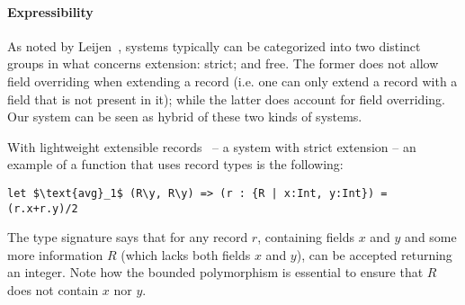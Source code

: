 \begin{comment}
\begin{lstlisting}[mathescape=true]
let $\text{addL}_3$ (A * { l : $\bot$ }) (x : A) : A & { l : $\bot$ } = $\ldots$ in $\ldots$ 
\end{lstlisting}
Unfortunately, our system does not support the $\bot$ type, so this program would not be accepted.
We will get into the reasons for this in further detail, in Section~\ref{sec:conclusion}.
\end{comment}


\paragraph{Expressibility}
As noted by Leijen~\cite{leijen2005extensible}, systems typically can be
categorized into two distinct groups in what concerns extension:
strict; and free. The former does not allow field overriding when
extending a record (i.e. one can only extend a record with a field
that is not present in it); while the latter does account for field
overriding.  Our system can be seen as hybrid of these two kinds of
systems.  

With lightweight extensible records~\cite{jones99lightweight} -- a system with strict extension -- an example of a function that uses 
record types is the following:
\begin{lstlisting}[mathescape=true]
let $\text{avg}_1$ (R\y, R\y) => (r : {R | x:Int, y:Int}) = (r.x+r.y)/2
\end{lstlisting}
The type signature says that for any record $r$, containing fields $x$
and $y$ and some more information $R$ (which lacks both fields $x$ and
$y$), can be accepted returning an integer.  Note how the bounded
polymorphism is essential to ensure that $R$ does not contain $x$ nor
$y$.

